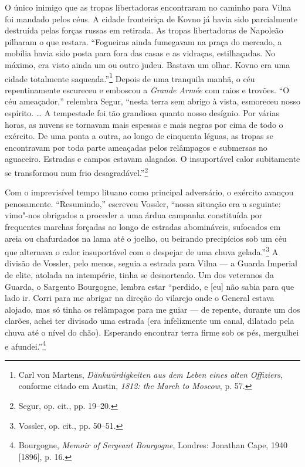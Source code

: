 O único inimigo que as tropas libertadoras encontraram no caminho para
Vilna foi mandado pelos céus. A cidade fronteiriça de Kovno já havia
sido parcialmente destruída pelas forças russas em retirada. As tropas
libertadoras de Napoleão pilharam o que restara. ``Fogueiras ainda
fumegavam na praça do mercado, a mobília havia sido posta para fora das
casas e as vidraças, estilhaçadas. No máximo, era visto ainda um ou
outro judeu. Bastava um olhar. Kovno era uma cidade totalmente
saqueada.''\footnote{Carl von Martens, \textit{Dänkwürdigkeiten aus dem Leben eines alten Offiziers}, conforme citado em Austin, \textit{1812: the March to Moscow}, p. 57.} Depois de uma tranquila manhã, o céu repentinamente escureceu e emboscou a \textit{Grande Armée} com raios e
trovões. ``O céu ameaçador,'' relembra Segur, ``nesta terra sem abrigo à
vista, esmoreceu nosso espírito. \ldots{} A tempestade foi tão grandiosa
quanto nosso desígnio. Por várias horas, as nuvens se tornavam mais
espessas e mais negras por cima de todo o exército. De uma ponta a
outra, ao longo de cinquenta léguas, as tropas se encontravam por toda
parte ameaçadas pelos relâmpagos e submersas no aguaceiro. Estradas e
campos estavam alagados. O insuportável calor subitamente se transformou
num frio desagradável.''\footnote{Segur, op. cit., pp. 19--20.}

Com o imprevisível tempo lituano como principal adversário, o exército
avançou penosamente. ``Resumindo,'' escreveu Vossler, ``nossa situação
era a seguinte: vimo"-nos obrigados a proceder a uma árdua campanha
constituída por frequentes marchas forçadas ao longo de estradas
abomináveis, sufocados em areia ou chafurdados na lama até o joelho, ou
beirando precipícios sob um céu que alternava o calor insuportável com o
despejar de uma chuva gelada.''\footnote{Vossler, op. cit., pp. 50--51.}
A divisão de Vossler, pelo menos, seguia a estrada para Vilna --- a Guarda
Imperial de elite, atolada na intempérie, tinha se desnorteado. Um dos
veteranos da Guarda, o Sargento Bourgogne, lembra estar ``perdido, e
{[}eu{]} não sabia para que lado ir. Corri para me abrigar na direção do
vilarejo onde o General estava alojado, mas só tinha os relâmpagos para
me guiar --- de repente, durante um dos clarões, achei ter divisado uma
estrada (era infelizmente um canal, dilatado pela chuva até o nível do
chão). Esperando encontrar terra firme sob os pés, mergulhei e
afundei.''\footnote{Bourgogne, \textit{Memoir of Sergeant Bourgogne}, Londres: Jonathan Cape, 1940 {[}1896{]}, p. 16.}

